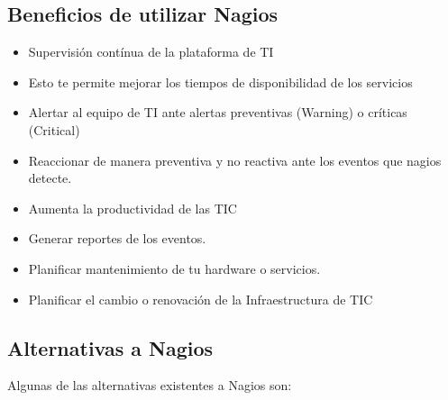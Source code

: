 \documentclass[11pt,a4paper]{article}
\begin{document}
\subsection{Beneficios de utilizar Nagios}

\begin{itemize}
\item Supervisión contínua de la plataforma de TI
\item Esto te permite mejorar los tiempos de disponibilidad de los servicios
\item Alertar al equipo de TI ante alertas preventivas (Warning) o críticas (Critical)
\item Reaccionar de manera preventiva y no reactiva ante los eventos que nagios detecte.
\item Aumenta la productividad de las TIC
\item Generar reportes de los eventos.
\item Planificar mantenimiento de tu hardware o servicios.
\item Planificar el cambio o renovación de la Infraestructura de TIC
\end{itemize}    


\subsection{Alternativas a Nagios}

    Algunas de las alternativas existentes a Nagios son:
\end{document}
